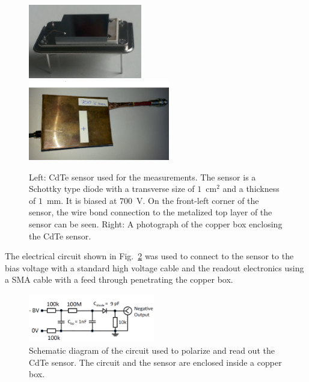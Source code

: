 %
\begin{figure}[htbp] 
\centering
\includegraphics[width=0.44\textwidth]{figures/CdTeSensor.png} 
\includegraphics[width=0.55\textwidth]{figures/CdTeSensorBox.png} 
\caption{Left: CdTe sensor used for the measurements. The sensor is a Schottky type diode with a transverse size 
of $1$~$\mathrm{cm}^{2}$ and a thickness of $1$~mm. It is biased at $700$~V. 
On the front-left corner of the sensor, the wire bond connection 
to the metalized top layer of the sensor can be seen. Right: A photograph of the copper box
enclosing the CdTe sensor. } 
\label{fig:CdTeSensor} 
\end{figure} 
%
The electrical circuit shown in Fig.~\ref{fig:cdtecircuit} was used to connect to the sensor to the bias 
voltage with a standard high voltage cable and the readout electronics using a SMA cable with a feed 
through penetrating the copper box.

%
\begin{figure}[htbp] 
\centering
\includegraphics[width=0.49\textwidth]{figures/circuit_CdTe.png} 
\caption{Schematic diagram of the circuit used to polarize and read out the 
CdTe sensor. The circuit and the sensor are enclosed inside a copper box. }
\label{fig:cdtecircuit} 
\end{figure} 
%

